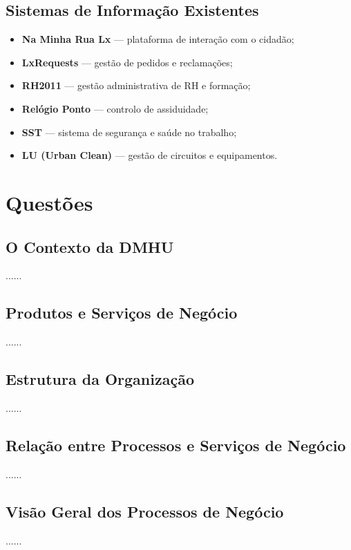 \documentclass[12pt,a4paper,final]{article}
\begin{document}
    \subsection{Sistemas de Informação Existentes}\label{subsec:sistemas-de-informacao-existentes}
    \begin{itemize}
        \item \textbf{Na Minha Rua Lx} — plataforma de interação com o cidadão;
        \item \textbf{LxRequests} — gestão de pedidos e reclamações;
        \item \textbf{RH2011} — gestão administrativa de RH e formação;
        \item \textbf{Relógio Ponto} — controlo de assiduidade;
        \item \textbf{SST} — sistema de segurança e saúde no trabalho;
        \item \textbf{LU (Urban Clean)} — gestão de circuitos e equipamentos.
    \end{itemize}


    \section{Questões}\label{sec:questoes}

    \subsection{O Contexto da DMHU}\label{subsec:o-contexto-da-dmhu}
    ......

    \subsection{Produtos e Serviços de Negócio}\label{subsec:produtos-e-servicos-do-negocio}
    ......

    \subsection{Estrutura da Organização}\label{subsec:estrutura-da-organizacao}
    ......

    \subsection{Relação entre Processos e Serviços de Negócio}\label{subsec:relacao-entre-processos-e-servicos-de-negocio}
    ......

    \subsection{Visão Geral dos Processos de Negócio}\label{subsec:visao-geral-dos-processos-de-negocio}
    ......
\end{document}
